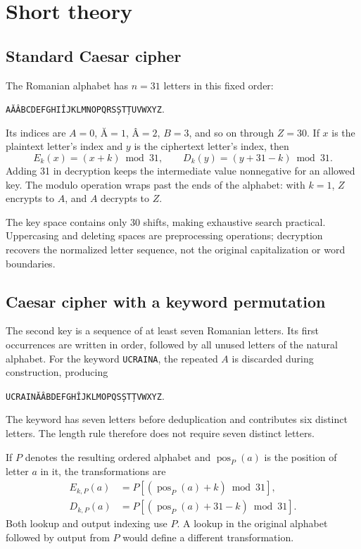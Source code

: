 \documentclass{utmreport}
\begin{document}
\chapter{Short theory}
\section{Standard Caesar cipher}
The Romanian alphabet has $n=31$ letters in this fixed order:
\begin{center}\texttt{AĂÂBCDEFGHIÎJKLMNOPQRSȘTȚUVWXYZ}.\end{center}
Its indices are $A=0$, $\text{Ă}=1$, $\text{Â}=2$, $B=3$, and so on through $Z=30$. If $x$ is the plaintext letter's index and $y$ is the ciphertext letter's index, then
\begin{equation}
E_k(x)=(x+k)\bmod31,\qquad D_k(y)=(y+31-k)\bmod31.
\end{equation}
Adding 31 in decryption keeps the intermediate value nonnegative for an allowed key. The modulo operation wraps past the ends of the alphabet: with $k=1$, $Z$ encrypts to $A$, and $A$ decrypts to $Z$.

The key space contains only 30 shifts, making exhaustive search practical. Uppercasing and deleting spaces are preprocessing operations; decryption recovers the normalized letter sequence, not the original capitalization or word boundaries.

\section{Caesar cipher with a keyword permutation}
The second key is a sequence of at least seven Romanian letters. Its first occurrences are written in order, followed by all unused letters of the natural alphabet. For the keyword \texttt{UCRAINA}, the repeated $A$ is discarded during construction, producing
\begin{center}\texttt{UCRAINĂÂBDEFGHÎJKLMOPQSȘTȚVWXYZ}.\end{center}
The keyword has seven letters before deduplication and contributes six distinct letters. The length rule therefore does not require seven distinct letters.

If $P$ denotes the resulting ordered alphabet and $\operatorname{pos}_P(a)$ is the position of letter $a$ in it, the transformations are
\begin{align}
E_{k,P}(a)&=P[(\operatorname{pos}_P(a)+k)\bmod31],\\
D_{k,P}(a)&=P[(\operatorname{pos}_P(a)+31-k)\bmod31].
\end{align}
Both lookup and output indexing use $P$. A lookup in the original alphabet followed by output from $P$ would define a different transformation.
\end{document}
